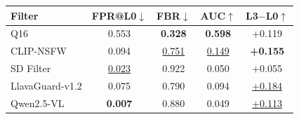 \begin{tabular}{lcccc}
\toprule
\textbf{Filter}
& \textbf{FPR@L0}$\downarrow$
& \textbf{FBR}$\downarrow$
& \textbf{AUC}$\uparrow$
& \textbf{L3$-$L0}$\uparrow$ \\
\midrule
\rowcolor{gray!20}
Q16
& 0.553 & \textbf{0.328} & \textbf{0.598} & +0.119 \\
CLIP-NSFW
& 0.094 & \underline{0.751} & \underline{0.149} & \textbf{+0.155} \\
SD Filter
& \underline{0.023} & 0.922 & 0.050 & +0.055 \\
LlavaGuard-v1.2
& 0.075 & 0.790 & 0.094 & \underline{+0.184} \\
Qwen2.5-VL
& \textbf{0.007} & 0.880 & 0.049 & \underline{+0.113} \\
\bottomrule
\end{tabular}